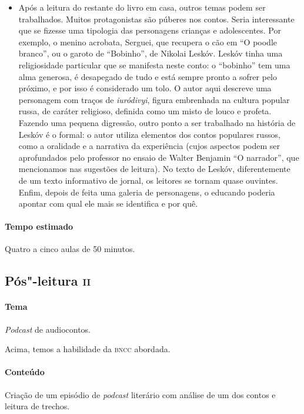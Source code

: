 \documentclass[11pt]{extarticle}
\begin{document}
\begin{itemize}
\item Após a leitura do restante do livro em casa, outros temas podem ser
trabalhados. Muitos protagonistas são púberes nos contos. Seria
interessante que se fizesse uma tipologia das personagens crianças e
adolescentes. Por exemplo, o menino acrobata, Serguei, que recupera o
cão em ``O poodle branco'', ou o garoto de ``Bobinho'', de Nikolai
Leskóv. Leskóv tinha uma religiosidade particular que se
manifesta neste conto: o ``bobinho'' tem uma alma generosa, é desapegado
de tudo e está sempre pronto a sofrer pelo próximo, e por isso é
considerado um tolo. O autor aqui descreve uma personagem com traços de
\emph{iuródivyi}, figura embrenhada na cultura popular russa, de caráter
religioso, definida como um misto de louco e profeta. Fazendo uma
pequena digressão, outro ponto a ser trabalhado na história de Leskóv é
o formal: o autor utiliza elementos dos contos populares russos, como a
oralidade e a narrativa da experiência (cujos aspectos podem ser
aprofundados pelo professor no ensaio de Walter Benjamin ``O
narrador'', que mencionamos nas sugestões de leitura). No texto de
Leskóv, diferentemente de um texto informativo de jornal, os leitores se
tornam quase ouvintes. Enfim, depois de feita uma galeria de
personagens, o educando poderia apontar com qual ele mais se identifica
e por quê.
\end{itemize}

\paragraph{Tempo estimado} Quatro a cinco aulas de 50 minutos.

\subsection{Pós"-leitura \textsc{ii}}

\paragraph{Tema} \emph{Podcast} de audiocontos.

Acima, temos a habilidade da \textsc{bncc} abordada.

\paragraph{Conteúdo}
Criação de um episódio de \emph{podcast} literário com análise de um dos
contos e leitura de trechos.
\end{document}
